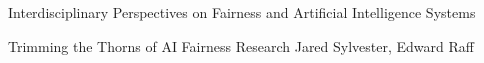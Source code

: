 \documentclass[11pt]{article}
\begin{document}
\begin{bulletin}
\begin{articlesection}{Interdisciplinary Perspectives on Fairness and Artificial Intelligence Systems}
%
\begin{article}
{Trimming the Thorns of AI Fairness Research}
{Jared Sylvester, Edward Raff}
\graphicspath{{submissions/sylvester_raff_final/}}

\end{article}

\end{articlesection}




%
%



\begin{callsection}


\end{callsection}
\end{bulletin}
\end{document}
